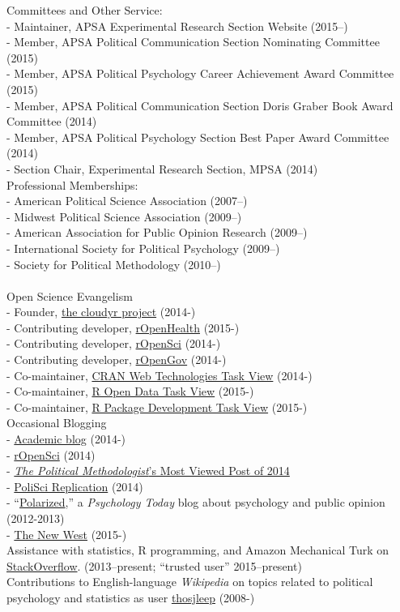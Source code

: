\documentclass[12pt]{article}
\newcommand{\topic}[1]{\pagebreak[3]\indent {\color{lg}{\footnotesize #1 }}\\}
\newcommand{\entry}[1]{\indent {\color{lg}\guillemotright}\hspace{2pt}#1\vspace{.25em}\\}
\newcommand{\subentry}[1]{{\color{lg}-} #1\vspace{.25em}\\}
\begin{document}
\entry{Committees and Other Service:}
\subentry{Maintainer, APSA Experimental Research Section Website (2015--)}
\subentry{Member, APSA Political Communication Section Nominating Committee (2015)}
\subentry{Member, APSA Political Psychology Career Achievement Award Committee (2015)}
\subentry{Member, APSA Political Communication Section Doris Graber Book Award Committee (2014)}
\subentry{Member, APSA Political Psychology Section Best Paper Award Committee (2014)}
\subentry{Section Chair, Experimental Research Section, MPSA (2014)}
\entry{Professional Memberships:}
\subentry{American Political Science Association (2007--)}
\subentry{Midwest Political Science Association (2009--)}
\subentry{American Association for Public Opinion Research (2009--)}
\subentry{International Society for Political Psychology (2009--)}
\subentry{Society for Political Methodology (2010--)}

\topic{Public Engagement}
\entry{Open Science Evangelism}
\subentry{Founder, \href{http://cloudyr.github.io/}{the cloudyr project} (2014-)}
\subentry{Contributing developer, \href{http://ropensci.org/}{rOpenHealth} (2015-)}
\subentry{Contributing developer, \href{http://ropensci.org/}{rOpenSci} (2014-)}
\subentry{Contributing developer, \href{http://ropengov.github.io/}{rOpenGov} (2014-)}
\subentry{Co-maintainer, \href{http://cran.r-project.org/web/views/WebTechnologies.html}{CRAN Web Technologies Task View} (2014-)}
\subentry{Co-maintainer, \href{https://www.github.com/ropensci/opendata}{R Open Data Task View} (2015-)}
\subentry{Co-maintainer, \href{https://www.github.com/leeper/PackageDevelopment}{R Package Development Task View} (2015-)}
\entry{Occasional Blogging}
\subentry{\href{http://thomasleeper.com/blog}{Academic blog} (2014-)}
\subentry{\href{http://ropensci.org/blog/}{rOpenSci} (2014)}
\subentry{\href{http://thepoliticalmethodologist.com/2015/01/05/introducing-the-annual-tpm-most-viewed-post-award-and-our-2014-winner/}{\textit{The Political Methodologist}'s Most Viewed Post of 2014}}
\subentry{\href{http://politicalsciencereplication.wordpress.com/}{PoliSci Replication} (2014)}
\subentry{``\href{http://www.psychologytoday.com/blog/polarized}{Polarized},'' a {\em Psychology Today} blog about psychology and public opinion (2012-2013)}
\subentry{\href{https://thewpsa.wordpress.com/2015/05/09/what-can-we-learn-from-10-1-million-facebook-users-its-complicated/}{The New West} (2015-)}
\entry{Assistance with statistics, R programming, and Amazon Mechanical Turk on \href{http://stackoverflow.com/users/2338862/thomas}{StackOverflow}. (2013--present; ``trusted user'' 2015--present)}
\entry{Contributions to English-language {\em Wikipedia} on topics related to political psychology and statistics as user \href{http://en.wikipedia.org/wiki/Special:Contributions/Thosjleep}{thosjleep} (2008-)}
\end{document}
